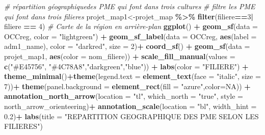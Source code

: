 \documentclass[
]{article}
\newenvironment{Shaded}{\begin{snugshade}}{\end{snugshade}}
\newcommand{\AttributeTok}[1]{\textcolor[rgb]{0.13,0.29,0.53}{#1}}
\newcommand{\CommentTok}[1]{\textcolor[rgb]{0.56,0.35,0.01}{\textit{#1}}}
\newcommand{\ConstantTok}[1]{\textcolor[rgb]{0.56,0.35,0.01}{#1}}
\newcommand{\DecValTok}[1]{\textcolor[rgb]{0.00,0.00,0.81}{#1}}
\newcommand{\FloatTok}[1]{\textcolor[rgb]{0.00,0.00,0.81}{#1}}
\newcommand{\FunctionTok}[1]{\textcolor[rgb]{0.13,0.29,0.53}{\textbf{#1}}}
\newcommand{\NormalTok}[1]{#1}
\newcommand{\OtherTok}[1]{\textcolor[rgb]{0.56,0.35,0.01}{#1}}
\newcommand{\SpecialCharTok}[1]{\textcolor[rgb]{0.81,0.36,0.00}{\textbf{#1}}}
\newcommand{\StringTok}[1]{\textcolor[rgb]{0.31,0.60,0.02}{#1}}
\begin{document}
\begin{Shaded}
\begin{Highlighting}[]
\CommentTok{\# répartition géographiquedes PME qui font dans trois  cultures}
\CommentTok{\# filtre les PME qui font dans trois filieres}
\NormalTok{projet\_map1}\OtherTok{\textless{}{-}}\NormalTok{projet\_map }\SpecialCharTok{\%\textgreater{}\%} \FunctionTok{filter}\NormalTok{(filiere}\SpecialCharTok{==}\DecValTok{3}\SpecialCharTok{|}\NormalTok{ filiere }\SpecialCharTok{==} \DecValTok{4}\NormalTok{)}
\CommentTok{\# Carte de la région en arrière{-}plan}
\FunctionTok{ggplot}\NormalTok{() }\SpecialCharTok{+}
  \FunctionTok{geom\_sf}\NormalTok{(}\AttributeTok{data =}\NormalTok{ OCCreg, }\AttributeTok{color =} \StringTok{"lightgreen"}\NormalTok{) }\SpecialCharTok{+}  
  \FunctionTok{geom\_sf\_label}\NormalTok{(}\AttributeTok{data =}\NormalTok{ OCCreg, }\FunctionTok{aes}\NormalTok{(}\AttributeTok{label =}\NormalTok{ adm1\_name), }\AttributeTok{color =} \StringTok{"darkred"}\NormalTok{, }\AttributeTok{size =} \DecValTok{2}\NormalTok{)}\SpecialCharTok{+}
  \FunctionTok{coord\_sf}\NormalTok{() }\SpecialCharTok{+}
  \FunctionTok{geom\_sf}\NormalTok{(}\AttributeTok{data =}\NormalTok{ projet\_map1, }\FunctionTok{aes}\NormalTok{(}\AttributeTok{color =}\NormalTok{ nom\_filiere)) }\SpecialCharTok{+}
  \FunctionTok{scale\_fill\_manual}\NormalTok{(}\AttributeTok{values =} \FunctionTok{c}\NormalTok{(}\StringTok{"\#E45756"}\NormalTok{, }\StringTok{"\#4C78A8"}\NormalTok{,}\StringTok{"darkgreen"}\NormalTok{,}\StringTok{"blue"}\NormalTok{)) }\SpecialCharTok{+} 
  \FunctionTok{labs}\NormalTok{(}\AttributeTok{color =} \StringTok{"FILIERE"}\NormalTok{) }\SpecialCharTok{+}
  \FunctionTok{theme\_minimal}\NormalTok{()}\SpecialCharTok{+}\FunctionTok{theme}\NormalTok{(}\AttributeTok{legend.text =} \FunctionTok{element\_text}\NormalTok{(}\AttributeTok{face =} \StringTok{"italic"}\NormalTok{, }\AttributeTok{size =} \DecValTok{7}\NormalTok{))}\SpecialCharTok{+}
  \FunctionTok{theme}\NormalTok{(}\AttributeTok{panel.background =} \FunctionTok{element\_rect}\NormalTok{(}\AttributeTok{fill =} \StringTok{"azure"}\NormalTok{,}\AttributeTok{color=}\ConstantTok{NA}\NormalTok{)) }\SpecialCharTok{+}
  \FunctionTok{annotation\_north\_arrow}\NormalTok{(}\AttributeTok{location =} \StringTok{"tl"}\NormalTok{, }\AttributeTok{which\_north =} \StringTok{"true"}\NormalTok{, }\AttributeTok{style =}\NormalTok{ north\_arrow\_orienteering)}\SpecialCharTok{+}
  \FunctionTok{annotation\_scale}\NormalTok{(}\AttributeTok{location =} \StringTok{"bl"}\NormalTok{, }\AttributeTok{width\_hint =} \FloatTok{0.2}\NormalTok{)}\SpecialCharTok{+}
  \FunctionTok{labs}\NormalTok{(}\AttributeTok{title =} \StringTok{"REPARTITION GEOGRAPHIQUE DES PME SELON LES FILIERES"}\NormalTok{)}
\end{Highlighting}
\end{Shaded}
\end{document}
